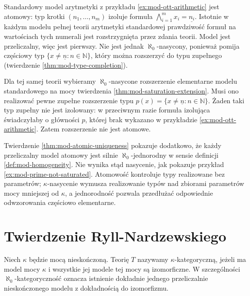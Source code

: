 \begin{przyklad}
\label{ex:mod-prime-not-saturated}
Standardowy model arytmetyki z przykładu
\ref{ex:mod-ott-arithmetic} jest atomowy:
typ krotki $(n_1,\ldots,n_m)$ izoluje formuła
$\bigwedge_{i=1}^m x_i=\underline{n_i}$.
Istotnie w każdym modelu pełnej teorii
arytmetyki standardowej prawdziwość formuł
na wartościach tych numerali jest rozstrzygnięta
przez zdania teorii. Model jest przeliczalny,
więc jest pierwszy. Nie jest jednak
$\aleph_0$-nasycony, ponieważ pomija częściowy
typ $\{x\ne\underline n:n\in\mathbb N\}$,
który można rozszerzyć do typu zupełnego
(twierdzenie \ref{thm:mod-type-completion}).
\end{przyklad}

\begin{przyklad}
\label{ex:mod-saturated-not-atomic}
Dla tej samej teorii wybieramy
$\aleph_0$-nasycone rozszerzenie elementarne
modelu standardowego na mocy twierdzenia
\ref{thm:mod-saturation-extension}.
Musi ono realizować pewne zupełne rozszerzenie
typu $p(x)=\{x\ne\underline n:n\in\mathbb N\}$.
Żaden taki typ zupełny nie jest izolowany:
w przeciwnym razie formuła izolująca świadczyłaby
o główności $p$, której brak wykazano
w przykładzie \ref{ex:mod-ott-arithmetic}.
Zatem rozszerzenie nie jest atomowe.
\end{przyklad}

Twierdzenie \ref{thm:mod-atomic-uniqueness}
pokazuje dodatkowo, że każdy przeliczalny
model atomowy jest silnie $\aleph_0$-jednorodny
w sensie definicji \ref{def:mod-homogeneity}.
Nie wynika stąd nasycenie, jak pokazuje
przykład \ref{ex:mod-prime-not-saturated}.
Atomowość kontroluje typy realizowane bez parametrów;
$\kappa$-nasycenie wymusza realizowanie typów nad
zbiorami parametrów mocy mniejszej od $\kappa$,
a jednorodność pozwala przedłużać odpowiednie
odwzorowania częściowo elementarne.

\section{Twierdzenie Ryll-Nardzewskiego}

\begin{definicja}
\label{def:mod-categoricity}
Niech $\kappa$ będzie mocą nieskończoną.
Teorię $T$ nazywamy $\kappa$-kategoryczną,
jeżeli ma model mocy $\kappa$ i wszystkie jej modele
tej mocy są izomorficzne.
W szczególności $\aleph_0$-kategoryczność oznacza
istnienie dokładnie jednego przeliczalnie nieskończonego
modelu z dokładnością do izomorfizmu.
\end{definicja}

